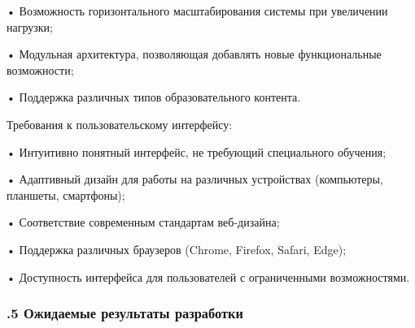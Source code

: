 {  \par \redline • Возможность горизонтального масштабирования системы при увеличении нагрузки;
  \par \redline • Модульная архитектура, позволяющая добавлять новые функциональные возможности;
  \par \redline • Поддержка различных типов образовательного контента.

  \par \redline Требования к пользовательскому интерфейсу:

  \par \redline • Интуитивно понятный интерфейс, не требующий специального обучения;
  \par \redline • Адаптивный дизайн для работы на различных устройствах (компьютеры, планшеты, смартфоны);
  \par \redline • Соответствие современным стандартам веб-дизайна;
  \par \redline • Поддержка различных браузеров (Chrome, Firefox, Safari, Edge);
  \par \redline • Доступность интерфейса для пользователей с ограниченными возможностями.

  \par
}

\subtitlespace

\subsubsection*{ 
  \gostTitleFont
  .5 Ожидаемые результаты разработки
} 

\subtitlespace

